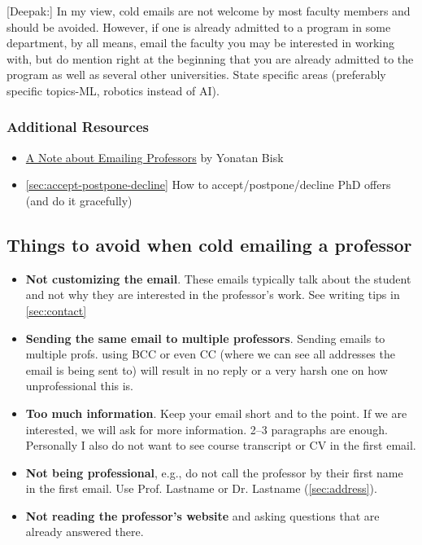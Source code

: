 \documentclass[oneside,11pt,dvipsnames]{book}
\newenvironment{commentbox}[1][]{
  \small
  \begin{mybox}
    {\small \textbf{#1}}
  }{
  \end{mybox}
}
\begin{document}
\begin{commentbox}
  [Deepak:]
  In my view, cold emails are not welcome by most faculty members and should be avoided. However, if one is already admitted to a program in some department, by all means, email the faculty you may be interested in working with, but do mention right at the beginning that you are already admitted to the program as well as several other universities. State specific areas (preferably specific topics-ML, robotics instead of AI).
\end{commentbox}



\subsubsection*{Additional Resources}
\begin{itemize}
  \item \href{https://yonatanbisk.com/emailing_professors.html}{A Note about Emailing Professors} by Yonatan Bisk
  \item \autoref{sec:accept-postpone-decline} How to accept/postpone/decline PhD offers (and do it gracefully)
\end{itemize}


\subsection{Things to avoid when cold emailing a professor}

\begin{itemize}
    
    \item \textbf{Not customizing the email}. These emails typically talk about the student and not why they are interested in the professor's work. See writing tips in \autoref{sec:contact}
    \item \textbf{Sending the same email to multiple professors}. Sending emails to multiple profs. using BCC or even CC (where we can see all addresses the email is being sent to) will result in no reply or a very harsh one on how unprofessional this is.
    \item \textbf{Too much information}. Keep your email short and to the point. If we are interested, we will ask for more information. 2--3 paragraphs are enough.  Personally I also do not want to see course transcript or CV in the first email.
    \item \textbf{Not being professional}, e.g., do not call the professor by their first name in the first email.  Use Prof. Lastname or Dr. Lastname (\autoref{sec:address}).
    \item \textbf{Not reading the professor's website} and asking questions that are already answered there.
\end{itemize}
\end{document}
